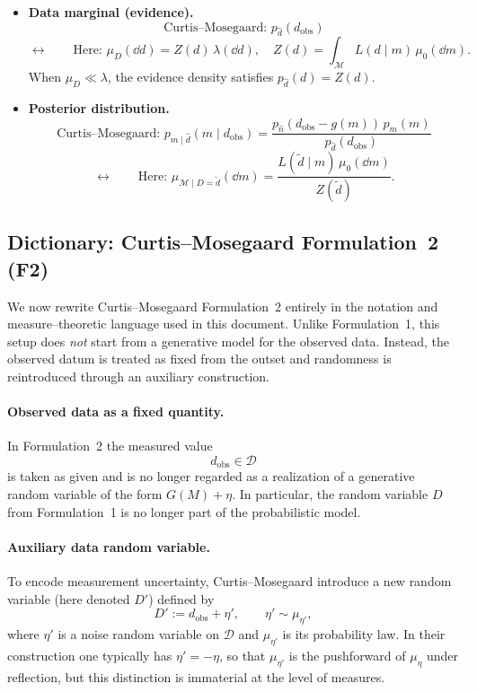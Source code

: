 \documentclass[11pt]{article}
\theoremstyle{remark}
\newcommand{\modelspace}{\mathcal{M}}
\newcommand{\dataspace}{\mathcal{D}}
\begin{document}
\begin{itemize}
\item \textbf{Data marginal (evidence).}
\[
\text{Curtis--Mosegaard: } p_{\hat d}(d_{\mathrm{obs}})
\]
\[
\longleftrightarrow
\qquad
\text{Here: }
\mu_D(\dd d)=Z(d)\,\lambda(\dd d),
\quad
Z(d)=\int_{\modelspace} L(d\mid m)\,\mu_0(\dd m).
\]
When \(\mu_D\ll\lambda\), the evidence density satisfies
\(p_{\hat d}(d)=Z(d)\).

\item \textbf{Posterior distribution.}
\[
\text{Curtis--Mosegaard: }
p_{m\mid \hat d}(m\mid d_{\mathrm{obs}})
=
\frac{p_{\hat n}(d_{\mathrm{obs}}-g(m))\,p_m(m)}
{p_{\hat d}(d_{\mathrm{obs}})}
\]
\[
\longleftrightarrow
\qquad
\text{Here: }
\mu_{\modelspace\mid D=\tilde d}(\dd m)
=
\frac{L(\tilde d\mid m)\,\mu_0(\dd m)}{Z(\tilde d)}.
\]

\end{itemize}

\subsection*{Dictionary: Curtis--Mosegaard Formulation~2 (F2)}

We now rewrite Curtis--Mosegaard Formulation~2 entirely in the notation and
measure--theoretic language used in this document.  Unlike Formulation~1, this
setup does \emph{not} start from a generative model for the observed data.
Instead, the observed datum is treated as fixed from the outset and randomness
is reintroduced through an auxiliary construction.

\paragraph{Observed data as a fixed quantity.}
In Formulation~2 the measured value
\[
d_{\mathrm{obs}}\in\dataspace
\]
is taken as given and is no longer regarded as a realization of a generative
random variable of the form \(G(M)+\eta\).  In particular, the random variable
\(D\) from Formulation~1 is no longer part of the probabilistic model.

\paragraph{Auxiliary data random variable.}
To encode measurement uncertainty, Curtis--Mosegaard introduce a new random
variable (here denoted \(D'\)) defined by
\[
D' := d_{\mathrm{obs}} + \eta',
\qquad \eta'\sim\mu_{\eta'},
\]
where \(\eta'\) is a noise random variable on \(\dataspace\) and
\(\mu_{\eta'}\) is its probability law.  In their construction one typically
has \(\eta'=-\eta\), so that \(\mu_{\eta'}\) is the pushforward of
\(\mu_\eta\) under reflection, but this distinction is immaterial at the level
of measures.
\end{document}
